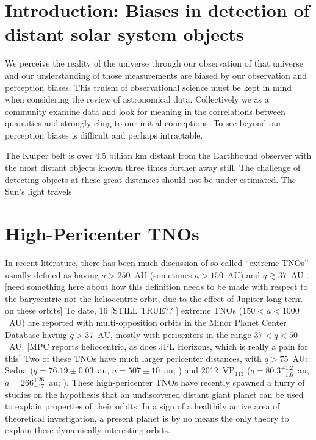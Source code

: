 \documentclass{aastex62}
\begin{document}
\section{Introduction: Biases in detection of distant solar system objects}

We perceive the reality of the universe through our observation of that universe and our understanding of those measurements are biased by our observation and perception biases. This truism of observational science must be kept in mind when considering the review of astronomical data. Collectively we as a community examine data and look for meaning in the correlations between quantities and strongly cling to our initial conceptions.  To see beyond our perception biases is difficult and perhaps intractable. 

The Kuiper belt is over 4.5 billion km distant from the Earthbound observer with the most distant objects known three times further away still.  The challenge of detecting objects at these great distances should not be under-estimated.  The Sun's light travels 

\section{High-Pericenter TNOs} \label{sec:highq}

In recent literature, there has been much discussion of so-called ``extreme TNOs'' usually defined as having $a>250$~AU (sometimes $a>150$~AU) and $q\gtrsim37$~AU \citep{Sheppardetal2016,bannister17}.
[need something here about how this definition needs to be made with respect to the barycentric not the heliocentric orbit, due to the effect of Jupiter long-term on these orbits]
To date, 16 [STILL TRUE?? ] extreme TNOs ($150<a<1000$~AU) are reported with multi-opposition orbits in the Minor Planet Center Database having $q>37$~AU, mostly with pericenters in the range $37<q<50$~AU.
[MPC reports heliocentric, as does JPL Horizons, which is really a pain for this]
Two of these TNOs have much larger pericenter distances, with $q>75$~AU: Sedna ($q=76.19 \pm 0.03$~au, $a=507 \pm 10$~au; \citealt{brownetal04}) and 2012~VP$_{113}$ ($q=80.3^{+1.2}_{-1.6}$~au, $a = 266^{+26}_{-17}$~au; \citealt{trujillosheppard14}). 
These high-pericenter TNOs have recently spawned a flurry of studies on the hypothesis that an undiscovered distant giant planet can be used to explain properties of their orbits. 
In a sign of a healthily active area of theoretical investigation, a present planet is by no means the only theory to explain these dynamically interesting orbits.
\end{document}
